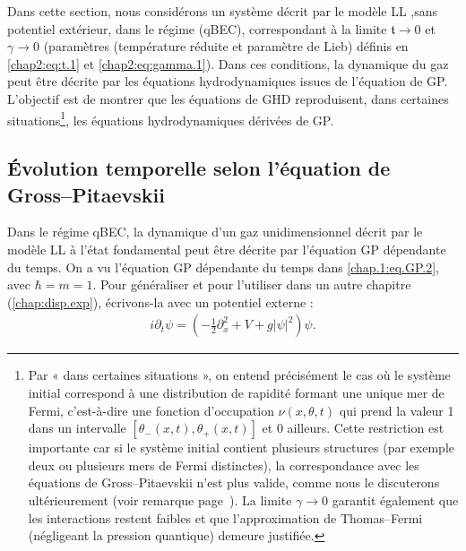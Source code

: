 Dans cette section, nous considérons un système décrit par le modèle \gls*{LL} ,sans potentiel extérieur,  dans le régime (\gls{qBEC}), correspondant à la limite $\mathfrak{t} \to 0$ et $\gamma \to 0$ (paramètres (température réduite et paramètre de Lieb)  définis en \eqref{chap2:eq:t.1} et \eqref{chap2:eq:gamma.1}).  Dans ces conditions, la dynamique du gaz peut être décrite par les équations hydrodynamiques issues de l’équation de \acrfull{GP}. L’objectif est de montrer que les équations de \gls{GHD} reproduisent, dans certaines situations\footnote{
Par « dans certaines situations », on entend précisément le cas où le système initial correspond à une distribution de rapidité formant une unique mer de Fermi, c'est-à-dire une fonction d'occupation $\nu(x,\theta,t)$ qui prend la valeur 1 dans un intervalle $[\theta_-(x,t), \theta_+(x,t)]$ et 0 ailleurs. Cette restriction est importante car si le système initial contient plusieurs structures (par exemple deux ou plusieurs mers de Fermi distinctes), la correspondance avec les équations de Gross–Pitaevskii n'est plus valide, comme nous le discuterons ultérieurement (voir remarque page~\pageref{rem:plusieurs_mers}). La limite $\gamma \to 0$ garantit également que les interactions restent faibles et que l'approximation de Thomas–Fermi (négligeant la pression quantique) demeure justifiée.
}, les équations hydrodynamiques dérivées de \gls{GP}.




\subsection{Évolution temporelle selon l’équation de Gross--Pitaevskii}
 
Dans le régime \gls{qBEC}, la dynamique d’un gaz unidimensionnel décrit par le modèle \gls{LL} à l’état fondamental peut être décrite par l’équation \gls{GP} dépendante du temps.
On a vu l'équation \gls{GP} dépendante du temps dans \eqref{chap.1:eq.GP.2}, avec $\hbar = m = 1$. Pour généraliser et pour l'utiliser dans un autre chapitre (\ref{chap:disp.exp}), écrivons-la avec un potentiel externe :
\begin{eqnarray}\label{chap.2:eq.GP.2}
	i \partial_t \psi = \left( - \frac{1}{2} \partial_x^2 + V + g \vert \psi \vert^2 \right) \psi .
\end{eqnarray}

